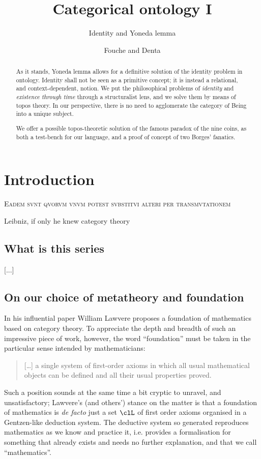 \documentclass{amsart}
\author{Fouche and Denta}
\title{Categorical ontology I}
\subtitle{Identity and Yoneda lemma}
\begin{document}
\maketitle
\begin{abstract}
  As it stands, Yoneda lemma allows for a definitive solution of the identity problem in ontology. Identity shall not be seen as a primitive concept; it is instead a relational, and context-dependent, notion. We put the philosophical problems of \emph{identity} and \emph{existence through time} through a structuralist lens, and we solve them by means of topos theory. In our perspective, there is no need to agglomerate the category of Being into a unique subject.

  We offer a possible topos-theoretic solution of the famous paradox of the nine coins, as both a test-bench for our language, and a proof of concept of two Borges' fanatics.
\end{abstract}
\section{Introduction}
\epigraph{\textsc{Eadem svnt qvorvm vnvm potest svbstitvi alteri per transmvtationem}}{Leibniz, if only he knew category theory}
\subsection{What is this series}
[...]
\subsection{On our choice of metatheory and foundation}
In his influential paper \cite{} William Lawvere proposes a foundation of mathematics based on category theory. To appreciate the depth and breadth of such an impressive piece of work, however, the word ``foundation'' must be taken in the particular sense intended by mathematicians:
\begin{quote}
  [\dots\unkern] a single system of first-order axioms in which all usual mathematical objects can be defined and all their usual properties proved.
\end{quote}
Such a position sounds at the same time a bit cryptic to unravel, and unsatisfactory; Lawvere's (and others') stance on the matter is that a foundation of mathematics is \emph{de facto} just a set $\clL$ of first order axioms organised in a Gentzen-like deduction system. The deductive system so generated reproduces mathematics as we know and practice it, i.e. provides a formalisation for something that already exists and needs no further explanation, and that we call ``mathematics''.
\end{document}
